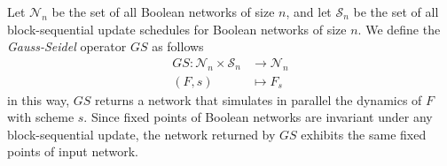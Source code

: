 \documentclass[preprint,12pt]{elsarticle}
\newcommand{\STG}{\textit{STG}}
\newcommand{\GS}{\textit{GS}}
\begin{document}
Let $\mathcal{N}_n$ be the set of all Boolean networks of size $n$, and let $\mathcal{S}_n$ be the set of all block-sequential update schedules for Boolean networks of size $n$. We define the \textit{Gauss-Seidel} operator $\GS$ %
as follows
\begin{align*} 
\GS:\mathcal{N}_n\times \mathcal{S}_n &\rightarrow\mathcal{N}_n\\
(F,s) &\mapsto F_s
\end{align*}
in this way, $\GS$ %
returns a network that simulates in parallel the dynamics of $F$ with scheme $s$. Since fixed points of Boolean networks are invariant under any block-sequential update, the network returned by $\GS$ %
exhibits the same fixed points of input network.%
\end{document}
